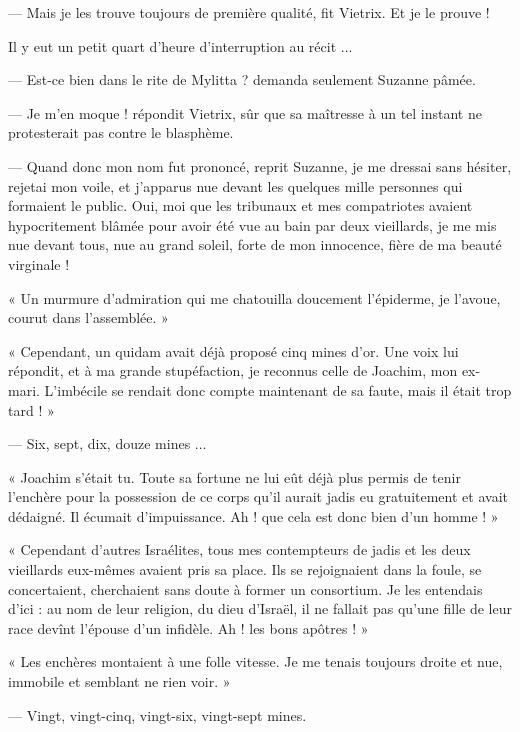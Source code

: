 \documentclass[a4paper, 11pt, oneside, polutonikogreek, french]{article}
\begin{document}
--- Mais je les trouve toujours de première qualité, fit Vietrix. Et je le prouve !

Il y eut un petit quart d'heure d'interruption au récit ...

\bigskip
\centerline{\EightStarTaper}
\centerline{\EightStarTaper\EightStarTaper}
\bigskip

--- Est-ce bien dans le rite de Mylitta ? demanda seulement Suzanne pâmée.

--- Je m'en moque ! répondit Vietrix, sûr que sa maîtresse à un tel instant ne protesterait pas contre le blasphème.

\bigskip
\centerline{\EightStarTaper}
\centerline{\EightStarTaper\EightStarTaper}
\bigskip

--- Quand donc mon nom fut prononcé, reprit Suzanne, je me dressai sans hésiter, rejetai mon voile, et j'apparus nue devant les quelques mille personnes qui formaient le public. Oui, moi que les tribunaux et mes compatriotes avaient hypocritement blâmée pour avoir été vue au bain par deux vieillards, je me mis nue devant tous, nue au grand soleil, forte de mon innocence, fière de ma beauté virginale !

« Un murmure d'admiration qui me chatouilla doucement l'épiderme, je l'avoue, courut dans l'assemblée. »

« Cependant, un quidam avait déjà proposé cinq mines d'or. Une voix lui répondit, et à ma grande stupéfaction, je reconnus celle de Joachim, mon ex-mari. L'imbécile se rendait donc compte maintenant de sa faute, mais il était trop tard ! »

--- Six, sept, dix, douze mines ...

« Joachim s'était tu. Toute sa fortune ne lui eût déjà plus permis de tenir l'enchère pour la possession de ce corps qu'il aurait jadis eu gratuitement et avait dédaigné. Il écumait d'impuissance. Ah ! que cela est donc bien d'un homme ! »

« Cependant d'autres Israélites, tous mes contempteurs de jadis et les deux vieillards eux-mêmes avaient pris sa place. Ils se rejoignaient dans la foule, se concertaient, cherchaient sans doute à former un consortium. Je les entendais d'ici : au nom de leur religion, du dieu d'Israël, il ne fallait pas qu'une fille de leur race devînt l'épouse d'un infidèle. Ah ! les bons apôtres ! »

« Les enchères montaient à une folle vitesse. Je me tenais toujours droite et nue, immobile et semblant ne rien voir. »

--- Vingt, vingt-cinq, vingt-six, vingt-sept mines.
\end{document}
